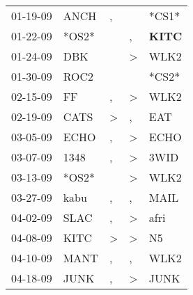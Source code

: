 \begin{supertabular}{p{0.07\textwidth}p{0.06\textwidth}p{0.02\textwidth}p{0.02\textwidth}p{0.06\textwidth}}
          01-19-09\textsuperscript{} &           ANCH\textsuperscript{} &                , &               &                            *CS1* \\
          01-22-09\textsuperscript{} &                            *OS2* &                  &             , &  \textbf{KITC\textsuperscript{}} \\
          01-24-09\textsuperscript{} &            DBK\textsuperscript{} &                  &  \textgreater &           WLK2\textsuperscript{} \\
          01-30-09\textsuperscript{} &           ROC2\textsuperscript{} &                  &               &                            *CS2* \\
          02-15-09\textsuperscript{} &             FF\textsuperscript{} &                , &  \textgreater &           WLK2\textsuperscript{} \\
          02-19-09\textsuperscript{} &           CATS\textsuperscript{} &     \textgreater &             , &            EAT\textsuperscript{} \\
          03-05-09\textsuperscript{} &           ECHO\textsuperscript{} &                , &  \textgreater &           ECHO\textsuperscript{} \\
          03-07-09\textsuperscript{} &           1348\textsuperscript{} &                , &  \textgreater &           3WID\textsuperscript{} \\
          03-13-09\textsuperscript{} &                            *OS2* &                  &  \textgreater &           WLK2\textsuperscript{} \\
          03-27-09\textsuperscript{} &           kabu\textsuperscript{} &                , &             , &           MAIL\textsuperscript{} \\
          04-02-09\textsuperscript{} &           SLAC\textsuperscript{} &                , &  \textgreater &           afri\textsuperscript{} \\
          04-08-09\textsuperscript{} &           KITC\textsuperscript{} &     \textgreater &  \textgreater &             N5\textsuperscript{} \\
          04-10-09\textsuperscript{} &           MANT\textsuperscript{} &                , &             , &           WLK2\textsuperscript{} \\
          04-18-09\textsuperscript{} &           JUNK\textsuperscript{} &                , &  \textgreater &           JUNK\textsuperscript{} \\

\end{supertabular}
